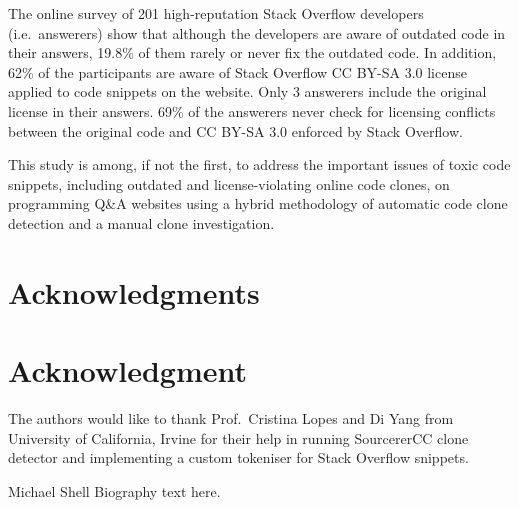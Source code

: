 \documentclass[10pt,journal,compsoc]{IEEEtran}
\begin{document}
The online survey of 201 high-reputation Stack Overflow developers (i.e.~answerers)
show that although the developers are aware of outdated code in their answers,
19.8\% of them rarely or never fix the outdated code. In addition, 62\% of the participants
are aware of Stack Overflow CC BY-SA 3.0 license applied to code snippets on the website.
Only 3 answerers include the original license in their answers. 69\% of the answerers
never check for licensing conflicts between the original code and CC BY-SA 3.0 
enforced by Stack Overflow.

This study is among, if not the first, to address the important issues of toxic
code snippets, including outdated and license-violating online code clones, on
programming Q\&A websites using a hybrid methodology of automatic code clone
detection and a manual clone investigation.


\ifCLASSOPTIONcompsoc
  \section*{Acknowledgments}
\else
  \section*{Acknowledgment}
\fi


The authors would like to thank Prof.~Cristina Lopes and Di Yang
from University of California, Irvine
for their help in running SourcererCC clone detector and implementing
a custom tokeniser for Stack Overflow snippets.



  

% 

\begin{IEEEbiography}{Michael Shell}
Biography text here.
\end{IEEEbiography}
\end{document}

